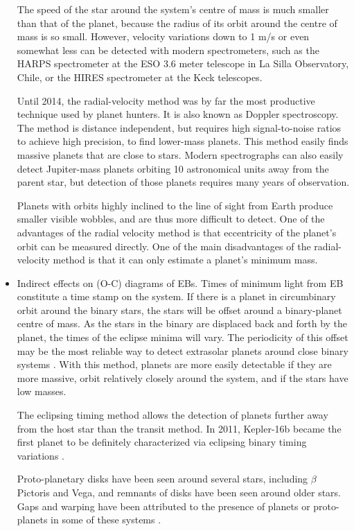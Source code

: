 \begin{itemize}
The speed of the star around the system's centre of mass is much smaller than that of the planet, because the radius of its orbit around the centre of mass is so small. However, velocity variations down to 1 m/s or even somewhat less can be detected with modern spectrometers, such as the HARPS spectrometer at the ESO 3.6 meter telescope in La Silla Observatory, Chile, or the HIRES spectrometer at the Keck telescopes.

Until 2014, the radial-velocity method was by far the most productive technique used by planet hunters. It is also known as Doppler spectroscopy. The method is distance independent, but requires high signal-to-noise ratios to achieve high precision, to find lower-mass planets. This method easily finds massive planets that are close to stars. Modern spectrographs can also easily detect Jupiter-mass planets orbiting 10 astronomical units away from the parent star, but detection of those planets requires many years of observation.

Planets with orbits highly inclined to the line of sight from Earth produce smaller visible wobbles, and are thus more difficult to detect. 
One of the advantages of the radial velocity method is that eccentricity of the planet's orbit can be measured directly. One of the main disadvantages of the radial-velocity method is that it can only estimate a planet's minimum mass.

\item Indirect effects on (O-C) diagrams of EBs.
Times of minimum light from EB constitute a time stamp on the system. If there is a planet in circumbinary orbit around the binary stars, the stars
will be offset around a binary-planet centre of mass. As the stars in the binary are displaced back and forth by the planet, the times of the
eclipse minima will vary. 
The periodicity of this offset may be the most reliable way to detect extrasolar planets around 
close binary systems \citep{deeg2000, doyle1998}. With this method, planets are more easily detectable 
if they are more massive, orbit relatively closely around the system, and if the stars have low masses.

The eclipsing timing method allows the detection of planets further away from the host star than the transit method. 
In 2011, Kepler-16b became the first planet
to be definitely characterized via eclipsing binary timing variations \citep{doyle2011}.

Proto-planetary disks have been seen around several stars, including $\beta$ Pictoris
and Vega, and remnants of disks have been seen around older stars. Gaps and
warping have been attributed to the presence of planets or proto-planets in some of
these systems \cite{milone2014}.
\end{itemize}


